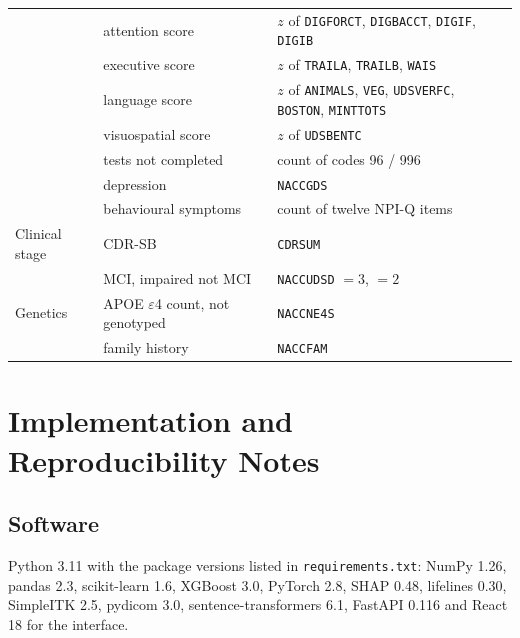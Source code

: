 \begin{table}[H]
\begin{tabularx}{\textwidth}{@{}lp{3.4cm}Y@{}}
 & attention score & $z$ of \texttt{DIGFORCT}, \texttt{DIGBACCT}, \texttt{DIGIF}, \texttt{DIGIB} \\
 & executive score & $z$ of \texttt{TRAILA}, \texttt{TRAILB}, \texttt{WAIS} \\
 & language score & $z$ of \texttt{ANIMALS}, \texttt{VEG}, \texttt{UDSVERFC}, \texttt{BOSTON}, \texttt{MINTTOTS} \\
 & visuospatial score & $z$ of \texttt{UDSBENTC} \\
 & tests not completed & count of codes 96 / 996 \\
 & depression & \texttt{NACCGDS} \\
 & behavioural symptoms & count of twelve NPI-Q items \\
\midrule
Clinical stage & CDR-SB & \texttt{CDRSUM} \\
 & MCI, impaired not MCI & \texttt{NACCUDSD} $= 3$, $= 2$ \\
\midrule
Genetics & APOE $\varepsilon$4 count, not genotyped & \texttt{NACCNE4S} \\
 & family history & \texttt{NACCFAM} \\
\bottomrule
\end{tabularx}
\end{table}

\chapter{Implementation and Reproducibility Notes}
\label{app:repro}

\section{Software}
Python 3.11 with the package versions listed in \texttt{requirements.txt}: NumPy 1.26, pandas 2.3, scikit-learn 1.6, XGBoost 3.0, PyTorch 2.8, SHAP 0.48, lifelines 0.30, SimpleITK 2.5, pydicom 3.0, sentence-transformers 6.1, FastAPI 0.116 and React 18 for the interface.

